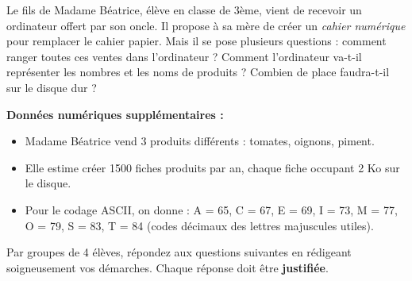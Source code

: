 \documentclass[11pt]{article}
\newcounter{popsec}
\newcounter{popsub}
\newcommand{\courssub}[1]{%
  \stepcounter{popsub}%
  \par\vspace{9pt}\noindent{\popxbold\fontsize{11.5}{13}\selectfont\color{popink}{\color{poporange}\thepopsec.\thepopsub}\hspace{6pt}#1}\par\nopagebreak\vspace{4pt}
}
\begin{document}
Le fils de Madame Béatrice, élève en classe de 3ème, vient de recevoir un ordinateur offert par son oncle. Il propose à sa mère de créer un \emph{cahier numérique} pour remplacer le cahier papier. Mais il se pose plusieurs questions : comment ranger toutes ces ventes dans l'ordinateur ? Comment l'ordinateur va-t-il représenter les nombres et les noms de produits ? Combien de place faudra-t-il sur le disque dur ?

\textbf{Données numériques supplémentaires :}
\begin{itemize}
\item Madame Béatrice vend 3 produits différents : tomates, oignons, piment.
\item Elle estime créer \num{1500} fiches produits par an, chaque fiche occupant \num{2} Ko sur le disque.
\item Pour le codage ASCII, on donne : A = 65, C = 67, E = 69, I = 73, M = 77, O = 79, S = 83, T = 84 (codes décimaux des lettres majuscules utiles).
\end{itemize}

\courssub{Consignes}

Par groupes de 4 élèves, répondez aux questions suivantes en rédigeant soigneusement vos démarches. Chaque réponse doit être \textbf{justifiée}.
\end{document}
